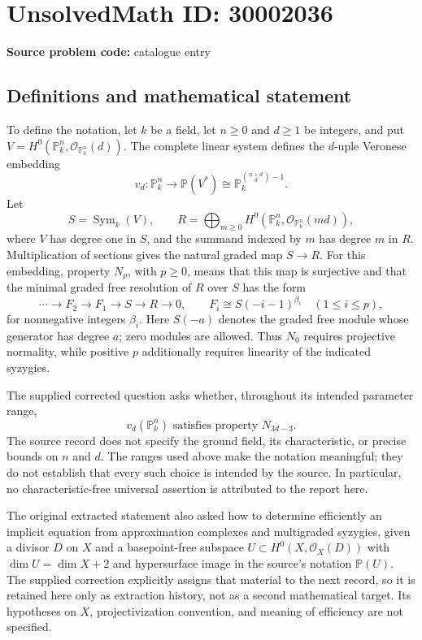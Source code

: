 \documentclass[11pt]{article}
\newcommand{\PP}{\mathbb{P}}
\begin{document}
\section*{UnsolvedMath ID: 30002036}
\textbf{Source problem code:} catalogue entry
\subsection{Definitions and mathematical statement}
To define the notation, let \(k\) be a field, let \(n\geq 0\) and \(d\geq 1\) be integers, and put \(V=H^0(\PP^n_k,\mathcal O_{\PP^n_k}(d))\). The complete linear system defines the \(d\)-uple Veronese embedding
\[
v_d\colon \PP^n_k\longrightarrow \PP(V^*)\cong\PP^{\binom{n+d}{d}-1}_k.
\]
Let
\[
S=\operatorname{Sym}_k(V),\qquad
R=\bigoplus_{m\geq 0}H^0(\PP^n_k,\mathcal O_{\PP^n_k}(md)),
\]
where \(V\) has degree one in \(S\), and the summand indexed by \(m\) has degree \(m\) in \(R\). Multiplication of sections gives the natural graded map \(S\to R\). For this embedding, property \(N_p\), with \(p\geq 0\), means that this map is surjective and that the minimal graded free resolution of \(R\) over \(S\) has the form
\[
\cdots\longrightarrow F_2\longrightarrow F_1\longrightarrow S\longrightarrow R\longrightarrow 0,
\qquad F_i\cong S(-i-1)^{\beta_i}\quad(1\leq i\leq p),
\]
for nonnegative integers \(\beta_i\). Here \(S(-a)\) denotes the graded free module whose generator has degree \(a\); zero modules are allowed. Thus \(N_0\) requires projective normality, while positive \(p\) additionally requires linearity of the indicated syzygies.

The supplied corrected question asks whether, throughout its intended parameter range,
\[
v_d(\PP^n_k)\text{ satisfies property }N_{3d-3}.
\]
The source record does not specify the ground field, its characteristic, or precise bounds on \(n\) and \(d\). The ranges used above make the notation meaningful; they do not establish that every such choice is intended by the source. In particular, no characteristic-free universal assertion is attributed to the report here.

The original extracted statement also asked how to determine efficiently an implicit equation from approximation complexes and multigraded syzygies, given a divisor \(D\) on \(X\) and a basepoint-free subspace \(U\subset H^0(X,\mathcal O_X(D))\) with \(\dim U=\dim X+2\) and hypersurface image in the source's notation \(\PP(U)\). The supplied correction explicitly assigns that material to the next record, so it is retained here only as extraction history, not as a second mathematical target. Its hypotheses on \(X\), projectivization convention, and meaning of efficiency are not specified.
\end{document}
